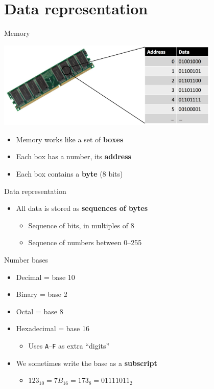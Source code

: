 \part{Data representation}
\frame{\partpage}

\begin{frame}{Memory}
	\pause
	\begin{center}
		\includegraphics[width=0.8\textwidth]{memory}
	\end{center}
	\begin{itemize}
		\item Memory works like a set of \textbf{boxes}
		\pause\item Each box has a number, its \textbf{address}
		\pause\item Each box contains a \textbf{byte} (8 bits)
	\end{itemize}
\end{frame}

\begin{frame}{Data representation} 
	\begin{itemize}
		\pause\item All data is stored as \textbf{sequences of bytes}
			\begin{itemize}
				\pause\item Sequence of bits, in multiples of 8
				\pause\item Sequence of numbers between 0--255
			\end{itemize}
	\end{itemize}
\end{frame}

\begin{frame}{Number bases}
	\begin{itemize}
		\pause\item Decimal = base 10
		\pause\item Binary = base 2
		\pause\item Octal = base 8
		\pause\item Hexadecimal = base 16
			\begin{itemize}
				\pause\item Uses \texttt{A}--\texttt{F} as extra ``digits''
			\end{itemize}
		\pause\item We sometimes write the base as a \textbf{subscript}
			\begin{itemize}
				\pause\item $123_{10} = 7B_{16} = 173_{8} = 01111011_{2}$
			\end{itemize}
	\end{itemize}
\end{frame}

